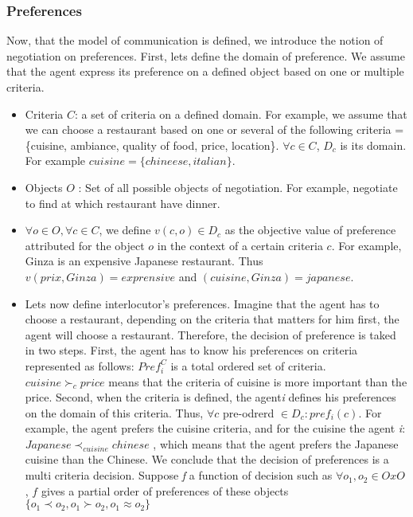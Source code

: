 \documentclass{llncs}
\begin{document}
\subsubsection{Preferences}
\par Now, that  the model of communication is defined, we introduce the notion of negotiation on preferences. First, lets define the domain of preference. We assume that the agent express its preference on a defined object based on one or multiple criteria.   
 \begin{itemize}
 \item Criteria $C$: a set of criteria on a defined domain. For example, we assume that we can choose a restaurant based on one or several of the following criteria = \{cuisine, ambiance, quality of food, price, location\}. $\forall c \in C$, $D_{c}$ is its domain. For example $cuisine = \{chineese, italian\}$.
 \item Objects $O$ : Set of all possible objects of negotiation. For example, negotiate to find at which restaurant have dinner.
 \item $\forall o \in O, \forall c \in C$, we define $v(c,o) \in D_{c}$ as the objective value of preference attributed for the object $o$ in the context of a certain criteria $c$. For example, Ginza is an expensive Japanese restaurant. Thus $v(prix, Ginza) = exprensive$ and $(cuisine, Ginza) = japanese$. 
 \item Lets now define interlocutor's preferences. Imagine that the agent has to choose a restaurant, depending on the criteria that matters for him first, the agent will choose a restaurant. Therefore, the decision of preference is taked in two steps. First, the agent has to know his preferences on criteria represented as follows: 
 $Pref_{i}^C $ is a total ordered set of criteria.   $ cuisine \succ _{c} price$ means that the criteria of cuisine is more important than the price. Second, when the criteria is defined, the agent\emph{i} defines his preferences on the domain of this criteria. Thus, $\forall c$ pre-odrerd  $\in D_{c}: pref_{i}(c) $. For example, the agent prefers the cuisine criteria, and for the cuisine the agent \emph{i}:  $Japanese  \prec _{cuisine} chinese$ , which means that the agent prefers the Japanese cuisine than the Chinese.  We conclude that the decision of preferences is a multi criteria decision. Suppose  \emph{f} a function of decision such as $\forall o_{1},o_{2} \in OxO$, $f$ gives a partial order of preferences of these objects $\{o_{1}\prec o_{2}, o_{1} \succ o_{2}, o_{1} \approx o_{2}\}$    
 \end{itemize}
\end{document}
